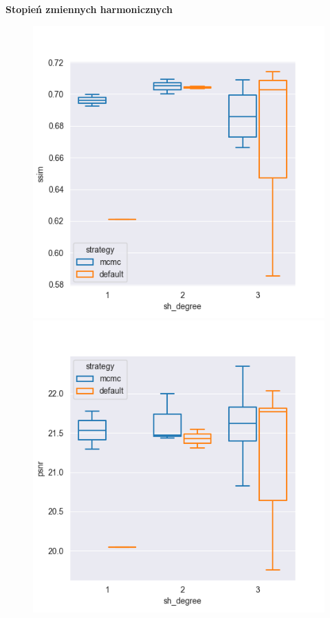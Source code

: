 \textbf{Stopień zmiennych harmonicznych}

\begin{figure}[h!]
    \centering
    \begin{minipage}{0.3\textwidth}
        \centering
        \includegraphics[width=\textwidth]{img/gs_metrics/ssim_sh_degree.png}
    \end{minipage}
    \hfill
    \begin{minipage}{0.3\textwidth}
        \centering
        \includegraphics[width=\textwidth]{img/gs_metrics/psnr_sh_degree.png}

\end{minipage}
\end{figure}
